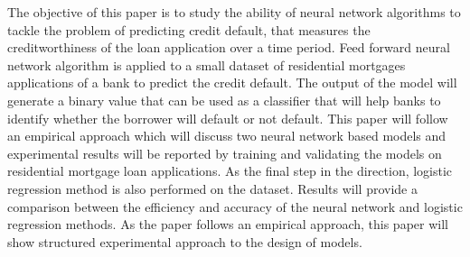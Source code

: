 \documentclass{article}[]
\begin{document}
The objective of this paper is to study the ability of neural network algorithms to tackle the problem of predicting credit default, that measures the creditworthiness of the loan application over a time period. Feed forward neural network algorithm is applied to a small dataset of residential mortgages applications of a bank to predict the credit default. The output of the model will generate a binary value that can be used as a classifier that will help banks to identify whether the borrower will default or not default. This paper will follow an empirical approach which will discuss two neural network based models and experimental results will be reported by training and validating the models on residential mortgage loan applications. As the final step in the direction, logistic regression method is also performed on the dataset. Results will provide a comparison between the efficiency and accuracy of the neural network and logistic regression methods. As the paper follows an empirical approach, this paper will show structured experimental approach to the design of models. 
\end{document}
